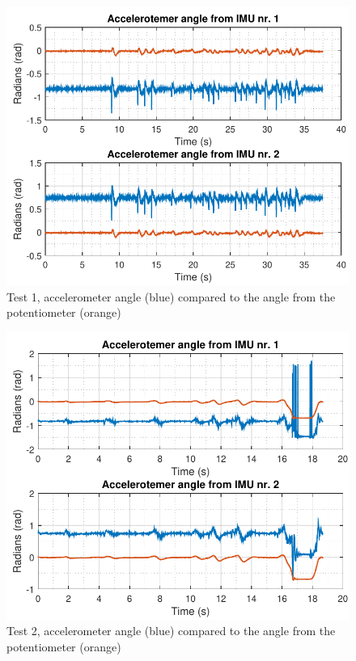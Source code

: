 \begin{figure}[H] 
	\centering 
	\includegraphics[scale=0.8]{figures/acc1}
	\caption{Test 1, accelerometer angle (blue) compared to the angle from the potentiometer (orange)}
	\label{data1acc}
\end{figure}
\begin{figure}[H] 
	\centering 
	\includegraphics[scale=0.8]{figures/acc2}
	\caption{Test 2, accelerometer angle (blue) compared to the angle from the potentiometer (orange)}
	\label{data2acc}
\end{figure}
